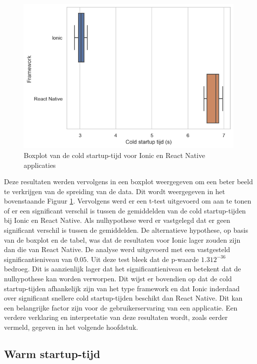 \begin{figure}
  \centering
  \includegraphics[width=0.7\linewidth]{img/boxplotCold}
  \caption{Boxplot van de cold startup-tijd voor Ionic en React Native applicaties}
  \label{fig:Boxplot van de cold startup-tijd voor Ionic en React Native applicaties}
\end{figure}

Deze resultaten werden vervolgens in een boxplot weergegeven om een beter beeld te verkrijgen van de spreiding van de data. Dit wordt weergegeven in het bovenstaande Figuur \ref{fig:Boxplot van de cold startup-tijd voor Ionic en React Native applicaties}. Vervolgens werd er een t-test uitgevoerd om aan te tonen of er een significant verschil is tussen de gemiddelden van de cold startup-tijden bij Ionic en React Native. Als nulhypothese werd er vastgelegd dat er geen significant verschil is tussen de gemiddelden. De alternatieve hypothese, op basis van de boxplot en de tabel, was dat de resultaten voor Ionic lager zouden zijn dan die van React Native. De analyse werd uitgevoerd met een vastgesteld significantieniveau van \(0.05\). Uit deze test bleek dat de p-waarde \(1.312^{-36}\) bedroeg. Dit is aanzienlijk lager dat het significantieniveau en betekent dat de nulhypothese kan worden verworpen. Dit wijst er bovendien op dat de cold startup-tijden afhankelijk zijn van het type framework en dat Ionic inderdaad over significant snellere cold startup-tijden beschikt dan React Native. Dit kan een belangrijke factor zijn voor de gebruikerservaring van een applicatie. Een verdere verklaring en interpretatie van deze resultaten wordt, zoals eerder vermeld, gegeven in het volgende hoofdstuk.


\subsection{Warm startup-tijd}
\label{subsec:warm-startup-tijd}

